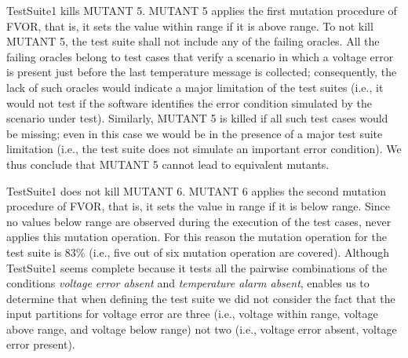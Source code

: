 TestSuite1 kills MUTANT 5. MUTANT 5 applies the first mutation procedure of FVOR, that is, it sets the value within range if it is above range.
To not kill MUTANT 5, the test suite shall not include any of the failing oracles. All the failing oracles belong to test cases that verify a scenario in which a voltage error is present just before the last temperature message is collected; consequently, the lack of such oracles would indicate a major limitation of the test suites (i.e., it would not test if the software identifies the error condition simulated by the scenario under test). Similarly, MUTANT 5 is killed if all such test cases would be missing; even in this case we would be in the presence of a major test suite limitation (i.e., the test suite does not simulate an important error condition). We thus conclude that MUTANT 5 cannot lead to equivalent mutants.

TestSuite1 does not kill MUTANT 6. MUTANT 6 applies the second mutation procedure of FVOR, that is, it sets the value in range if it is below range. Since no values below range are observed during the execution of the test cases, \APPR never applies this mutation operation. For this reason the mutation operation for the test suite is 83\% (i.e., five out of six mutation operation are covered). Although TestSuite1 seems complete because it tests all the pairwise combinations of the conditions \emph{voltage error absent} and \emph{temperature alarm absent}, \APPR enables us to determine that when defining the test suite we did not consider the fact that the input partitions for voltage error are three (i.e., voltage within range, voltage above range, and voltage below range) not two (i.e., voltage error absent, voltage error present).




